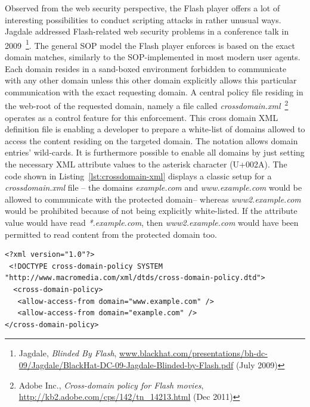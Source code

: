       Observed from the web security perspective, the Flash player offers a lot of interesting possibilities to conduct scripting attacks in rather unusual ways. Jagdale addressed Flash-related web security problems in a conference talk in 2009~\footnote{Jagdale, \textit{Blinded By Flash}, \url{www.blackhat.com/presentations/bh-dc-09/Jagdale/BlackHat-DC-09-Jagdale-Blinded-by-Flash.pdf} (July 2009)}. The general SOP model the Flash player enforces is based on the exact domain matches, similarly to the SOP-implemented in most modern user agents. Each domain resides in a sand-boxed environment forbidden to communicate with any other domain unless this other domain explicitly allows this particular communication with the exact requesting domain. A central policy file residing in the web-root of the requested domain, namely a file called \textit{crossdomain.xml}~\footnote{Adobe Inc., \textit{Cross-domain policy for Flash movies}, \url{http://kb2.adobe.com/cps/142/tn_14213.html} (Dec 2011)} operates as a control 
feature for this enforcement. This cross domain XML definition file is enabling a developer to prepare a white-list of domains allowed to access the content residing on the targeted domain. The notation allows domain entries' wild-cards. It is furthermore possible to enable all domains by just setting the necessary XML attribute values to the asterisk character (U+002A). The code shown in Listing~\ref{lst:crossdomain-xml} displays a classic setup for a \textit{crossdomain.xml} file -- the domains \textit{example.com} and \textit{www.example.com} would be allowed to communicate with the protected domain-- whereas \textit{www2.example.com} would be prohibited because of not being explicitly white-listed. If the attribute value would have read \textit{*.example.com}, then \textit{www2.example.com} would have been permitted to read content from the protected domain too.

\begin{lstlisting}[captionpos=b,label=lst:crossdomain-xml,caption=A typical crossdomain.xml implementation; it allows two origins to request data from the deploying domain]
<?xml version="1.0"?>
 <!DOCTYPE cross-domain-policy SYSTEM "http://www.macromedia.com/xml/dtds/cross-domain-policy.dtd">
  <cross-domain-policy>
   <allow-access-from domain="www.example.com" />
   <allow-access-from domain="example.com" />
</cross-domain-policy> 
\end{lstlisting}


